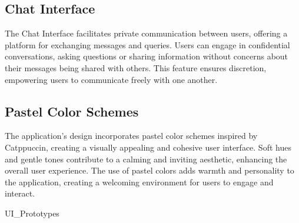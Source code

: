 \subsection{Chat Interface}

The Chat Interface facilitates private communication between users, offering a platform for exchanging messages and queries. Users can engage in confidential conversations, asking questions or sharing information without concerns about their messages being shared with others. This feature ensures discretion, empowering users to communicate freely with one another. 

\subsection{Pastel Color Schemes}

The application's design incorporates pastel color schemes inspired by Catppuccin, creating a visually appealing and cohesive user interface. Soft hues and gentle tones contribute to a calming and inviting aesthetic, enhancing the overall user experience. The use of pastel colors adds warmth and personality to the application, creating a welcoming environment for users to engage and interact.



{UI_Prototypes}
